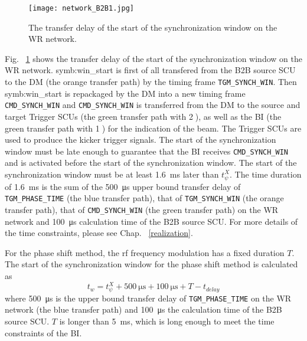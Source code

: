  \begin{figure}[!htb]
   \centering   
   \texttt{[image: network\_B2B1.jpg]}
   \caption{The transfer delay of the start of the synchronization window on the WR network.}
   \label{network_B2B1}
\end{figure}
Fig. ~\ref{network_B2B1} shows the transfer delay of the start of the synchronization window on the WR network. \gls{symb:win_start} is first of all transfered from the B2B source SCU to the DM (the orange transfer path) by the timing frame \verb|TGM_SYNCH_WIN|. Then \gls{symb:win_start} is repackaged by the DM into a new timing frame \verb|CMD_SYNCH_WIN| and \verb|CMD_SYNCH_WIN| is transferred from the DM to the source and target Trigger SCUs  (the green transfer path with \textcircled{2}), as well as the BI (the green transfer path with \textcircled{1}) for the indication of the beam. The Trigger SCUs are used to produce the kicker trigger signals. The start of the synchronization window must be late enough to guarantee that the BI receives \verb|CMD_SYNCH_WIN| and is activated before the start of the synchronization window. The start of the synchronization window must be at least \SI{1.6}{\ms} later than $t_\psi^\mathit{X}$. The time duration of \SI{1.6}{\ms} is the sum of the \SI{500}{\us} upper bound transfer delay of \verb|TGM_PHASE_TIME| (the blue transfer path), that of \verb|TGM_SYNCH_WIN| (the orange transfer path), that of \verb|CMD_SYNCH_WIN| (the green transfer path) on the WR network and \SI{100}{\us} calculation time of the B2B source SCU. For more details of the time constraints, please see Chap. ~\ref{realization}.

For the phase shift method, the rf frequency modulation has a fixed duration $T$. The start of the synchronization window for the phase shift method is calculated as
\begin{equation}
t_\mathit{w}=t_\psi^\mathit{X}+\SI{500}{\us}+\SI{100}{\us}+T-t_\mathit{delay}\label{syn_win_start}
\end{equation}
where \SI{500}{\us} is the upper bound transfer delay of \verb|TGM_PHASE_TIME| on the WR network (the blue transfer path) and \SI{100}{\us} the calculation time of the B2B source SCU. $T$ is longer than \SI{5}{\ms}, which is long enough to meet the time constraints of the BI. 

